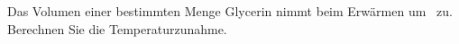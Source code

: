 Das Volumen einer bestimmten Menge Glycerin nimmt beim Erwärmen um \pGO\ zu. Berechnen Sie die Temperaturzunahme.
